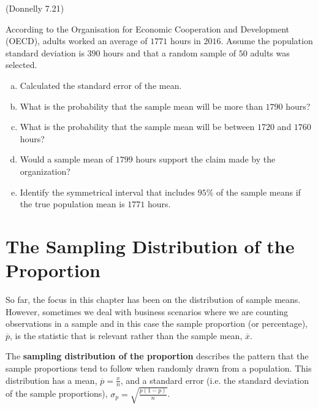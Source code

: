 \documentclass[12pt, letterpaper]{article}
\newcounter{exercise}
\theoremstyle{definition}
\begin{document}
\vfill
\vfill
\vfill


\begin{exercise}  (Donnelly 7.21)

According to the Organisation for Economic Cooperation and Development (OECD), adults worked an average of $1771$ hours in $2016$.  Assume the population standard deviation is $390$ hours and that a random sample of $50$ adults was selected.

\end{exercise}


\begin{enumerate}[(a)]

\item Calculated the standard error of the mean.

\vfill

\item What is the probability that the sample mean will be more than $1790$ hours?

\vfill
\vfill

\item What is the probability that the sample mean will be between $1720$ and $1760$ hours?

\vfill
\vfill

\newpage

\item Would a sample mean of $1799$ hours support the claim made by the organization?

\vfill
\vfill
\vfill
\vfill

\item Identify the symmetrical interval that includes $95\%$ of the sample means if the true population mean is $1771$ hours.

\vfill
\vfill
\vfill
\vfill

\end{enumerate}


\section*{The Sampling Distribution of the Proportion}

\noindent So far, the focus in this chapter has been on the distribution of sample means.  However, sometimes we deal with business scenarios where we are counting observations in a sample and in this case the sample proportion (or percentage), $\overline{p}$, is the statistic that is relevant rather than the sample mean, $\overline{x}$.

\begin{defn}
The \textbf{sampling distribution of the proportion} describes the pattern that the sample proportions tend to follow when randomly drawn from a population.  This distribution has a mean, $\overline{p}=\frac{x}{n}$, and a standard error (i.e. the standard deviation of the sample proportions), $\sigma_p = \sqrt{\frac{p(1-p)}{n}}$.
\end{defn}
\end{document}
